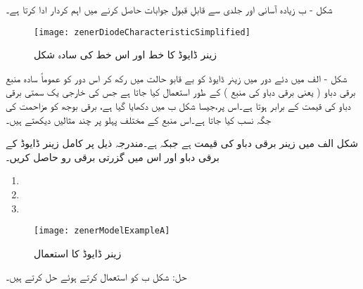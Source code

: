 شکل  - ب زیادہ آسانی اور جلدی سے قابلِ قبول جوابات حاصل کرنے میں اہم کردار ادا کرتا ہے۔
\begin{figure}
\centering
\texttt{[image: zenerDiodeCharacteristicSimplified]}
\caption{زینر ڈایوڈ کا خط اور اس خط کی سادہ شکل }
\label{شکل_زینر_خط_کی_سادہ_شکل}
\end{figure}
شکل  - الف میں دئے دور میں زینر ڈایوڈ کو بے قابو حالت میں رکھ کر اس دور کو عموماً سادہ منبع برقی دباو ( یعنی برقی دباو کی منبع ) کے طور استعمال کیا جاتا ہے جس کی خارجی یک سمتی برقی دباو کی قیمت   کے برابر ہوتا ہے۔اس پر،جیسا شکل   ب میں دکھایا گیا ہے، برقی بوجھ کو مزاحمت  کی جگہ نسب کیا جاتا ہے۔اس منبع کے مختلف پہلو پر چند مثالیں دیکھتے ہیں۔

 
شکل  الف میں زینر برقی دباو   کی قیمت  ہے جبکہ   ہے۔مندرجہ ذیل   پر کامل زینر ڈایوڈ کے برقی دباو اور اس میں گزرتی برقی رو حاصل کریں۔
\begin{enumerate}
\item
{}
\item
{}
\item
{}
\end{enumerate}
\begin{figure}
\centering
\texttt{[image: zenerModelExampleA]}
\caption{زینر ڈایوڈ کا استعمال}
\label{شکل_زینر_ڈایوڈ_کا_استعمال}
\end{figure}
حل:	شکل     ب کو استعمال کرتے ہوئے حل کرتے ہیں۔
